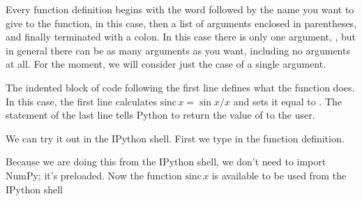 \documentclass[letterpaper,10pt,english]{sphinxmanual}
\begin{document}
\begin{sphinxVerbatim}[commandchars=\\\{\}]
 
      
     
\end{sphinxVerbatim}

\sphinxAtStartPar
Every function definition begins with the word  followed by the name you want to give to the function,  in this case, then a list of arguments enclosed in parentheses, and finally terminated with a colon.  In this case there is only one argument, , but in general there can be as many arguments as you want, including no arguments at all.  For the moment, we will consider just the case of a single argument.

\sphinxAtStartPar
The indented block of code following the first line defines what the function does.  In this case, the first line calculates \(\mathrm{sinc}\,x = \sin x/x\) and sets it equal to .  The  statement of the last line tells Python to return the value of  to the user.

\sphinxAtStartPar
We can try it out in the IPython shell.  First we type in the function definition.

\begin{sphinxVerbatim}[commandchars=\\\{\}]
 
       
      
\end{sphinxVerbatim}

\sphinxAtStartPar
Because we are doing this from the IPython shell, we don’t need to import NumPy; it’s preloaded.  Now the function \(\mathrm{sinc}\,x\) is available to be used from the IPython shell

\begin{sphinxVerbatim}[commandchars=\\\{\},numbers=left,firstnumber=1,stepnumber=1]

  


\end{sphinxVerbatim}
\end{document}
